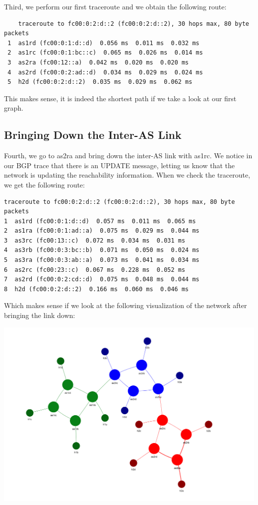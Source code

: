 Third, we perform our first traceroute and we obtain the following route:

\begin{verbatim}
    traceroute to fc00:0:2:d::2 (fc00:0:2:d::2), 30 hops max, 80 byte packets
 1  as1rd (fc00:0:1:d::d)  0.056 ms  0.011 ms  0.032 ms
 2  as1rc (fc00:0:1:bc::c)  0.065 ms  0.026 ms  0.014 ms
 3  as2ra (fc00:12::a)  0.042 ms  0.020 ms  0.020 ms
 4  as2rd (fc00:0:2:ad::d)  0.034 ms  0.029 ms  0.024 ms
 5  h2d (fc00:0:2:d::2)  0.035 ms  0.029 ms  0.062 ms
\end{verbatim}


This makes sense, it is indeed the shortest path if we take a look at our first graph.

\subsection{Bringing Down the Inter-AS Link}

Fourth, we go to as2ra and bring down the inter-AS link with as1rc. We notice in our BGP trace that there is an UPDATE message, letting us know that the network is updating the reachability information. When we check the traceroute, we get the following route:

\begin{verbatim}
traceroute to fc00:0:2:d::2 (fc00:0:2:d::2), 30 hops max, 80 byte packets
1  as1rd (fc00:0:1:d::d)  0.057 ms  0.011 ms  0.065 ms
2  as1ra (fc00:0:1:ad::a)  0.075 ms  0.029 ms  0.044 ms
3  as3rc (fc00:13::c)  0.072 ms  0.034 ms  0.031 ms
4  as3rb (fc00:0:3:bc::b)  0.071 ms  0.050 ms  0.024 ms
5  as3ra (fc00:0:3:ab::a)  0.073 ms  0.041 ms  0.034 ms
6  as2rc (fc00:23::c)  0.067 ms  0.228 ms  0.052 ms
7  as2rd (fc00:0:2:cd::d)  0.075 ms  0.048 ms  0.044 ms
8  h2d (fc00:0:2:d::2)  0.166 ms  0.060 ms  0.046 ms
\end{verbatim}


Which makes sense if we look at the following visualization of the network after bringing the link down:

\begin{center}
\includegraphics[scale=0.6]{Lab4/graphics/ex5graph2.png}
\end{center}

